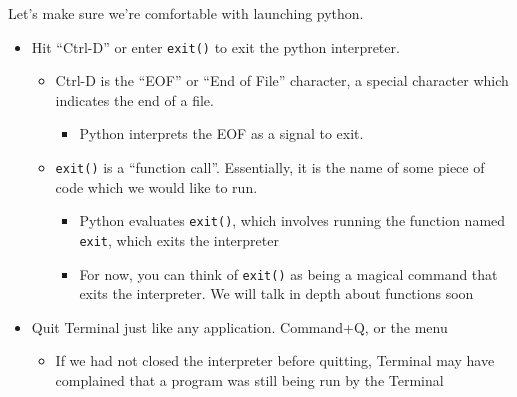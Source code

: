 Let's make sure we're comfortable with launching python.
\begin{itemize}
    \item Hit ``Ctrl-D'' or enter \texttt{exit()} to exit the python interpreter.
    \begin{itemize}
        \item Ctrl-D is the ``EOF'' or ``End of File'' character, a special character which indicates the end of a file.
        \begin{itemize}
            \item Python interprets the EOF as a signal to exit.
        \end{itemize}
    \item \texttt{exit()} is a ``function call''. Essentially, it is the name of some piece of code which we would like to run.
        \begin{itemize}
            \item Python evaluates \texttt{exit()}, which involves running the function named \texttt{exit}, which exits the interpreter
            \item For now, you can think of \texttt{exit()} as being a magical command that exits the interpreter. We will talk in depth about functions soon
        \end{itemize}
    \end{itemize}
    \item Quit Terminal just like any application. Command+Q, or the menu
    \begin{itemize}
        \item If we had not closed the interpreter before quitting, Terminal may have complained that a program was still being run by the Terminal
    \end{itemize}
\end{itemize}


